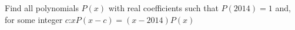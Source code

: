 Find all polynomials $P(x)$ with real coefficients such that $P(2014) = 1$ and, for some integer $c$:$xP(x-c) = (x - 2014)P(x)$